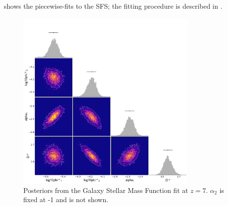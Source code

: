  shows the piecewise-fits to the SFS; the fitting procedure is described in .

\begin{figure}
	\includegraphics[width=0.8\textwidth]{images/posteriors_flares_7.png}
    \caption{Posteriors from the Galaxy Stellar Mass Function fit at $z = 7$. $\alpha_2$ is fixed at -1 and is not shown.
    }
    \label{fig:posteriors}
\end{figure}


